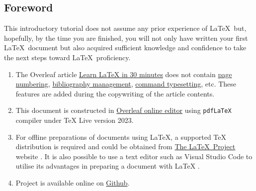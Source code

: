 \begin{center}
\section*{Foreword}
\end{center}

This introductory tutorial does not assume any prior experience of \LaTeX\ but, hopefully, by the time you are finished, you will not only have written your first \LaTeX\ document but also acquired sufficient knowledge and confidence to take the next steps toward \LaTeX\ proficiency.

\begin{enumerate}[label=\textit{\underline{Note \arabic*:}}]  
    \item The Overleaf article \href{https://www.overleaf.com/learn/latex/Learn_LaTeX_in_30_minutes}{Learn LaTeX in 30 minutes} does not contain \href{https://www.overleaf.com/learn/latex/Page_numbering}{page numbering}, \href{https://www.overleaf.com/learn/latex/Bibliography_management_in_LaTeX}{bibliography management}, \href{https://www.overleaf.com/learn/latex/Questions/Using_%5Cverb_to_typeset_the_text_of_LaTeX_commands}{command typesetting}, etc. These features are added during the copywriting of the article contents.
    \item This document is constructed in \href{https://www.overleaf.com/}{Overleaf online editor} using \verb|pdfLaTeX| compiler under TeX Live version 2023.
    \item For offline preparations of documents using LaTeX, a supported TeX distribution is required and could be obtained from \href{https://www.latex-project.org/}{The \LaTeX\ Project} website \cite{The_LaTeX_Project_get}. It is also possible to use a text editor such as Visual Studio Code to utilise its advantages in preparing a document with LaTeX \cite{Lee_2023}.
    \item Project is available online on \href{https://github.com/Dreamy-Z3r0/LearningLaTeX}{Github}.
\end{enumerate}
